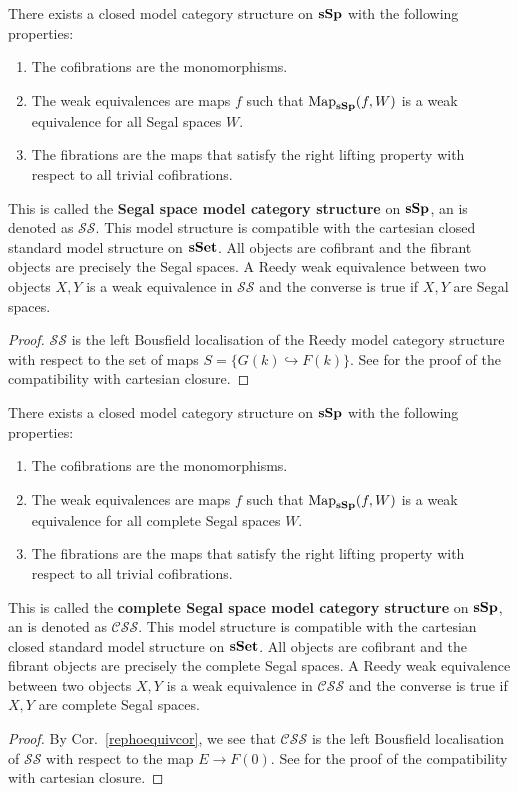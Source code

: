 \begin{refsection}
\begin{thm}
There exists a closed model category structure on $\mathbf{sSp}$ with the following properties:
\begin{enumerate}
\item The cofibrations are the monomorphisms.
\item The weak equivalences are maps $f$ such that $\operatorname{\mathrm{Map}}_{\mathbf{sSp}}(f,W)$ is a weak equivalence for all Segal spaces $W$.
\item The fibrations are the maps that satisfy the right lifting property with respect to all trivial cofibrations.
\end{enumerate}
This is called the \textbf{Segal space model category structure} on $\mathbf{sSp}$, an is denoted as $\mathcal{SS}$. This model structure is compatible with the cartesian closed standard model structure on $\mathbf{sSet}$. All objects are cofibrant and the fibrant objects are precisely the Segal spaces. A Reedy weak equivalence between two objects $X,Y$ is a weak equivalence in $\mathcal{SS}$ and the converse is true if $X,Y$ are Segal spaces.
\end{thm}
\begin{proof}
$\mathcal{SS}$ is the left Bousfield localisation of the Reedy model category structure with respect to the set of maps $S=\{G(k)\hookrightarrow F(k)\}$. See \cite[Thm 7.1]{rezk} for the proof of the compatibility with cartesian closure.
\end{proof}

\begin{thm}
There exists a closed model category structure on $\mathbf{sSp}$ with the following properties:
\begin{enumerate}
\item The cofibrations are the monomorphisms.
\item The weak equivalences are maps $f$ such that $\operatorname{\mathrm{Map}}_{\mathbf{sSp}}(f,W)$ is a weak equivalence for all complete Segal spaces $W$.
\item The fibrations are the maps that satisfy the right lifting property with respect to all trivial cofibrations.
\end{enumerate}
This is called the \textbf{complete Segal space model category structure} on $\mathbf{sSp}$, an is denoted as $\mathcal{CSS}$. This model structure is compatible with the cartesian closed standard model structure on $\mathbf{sSet}$. All objects are cofibrant and the fibrant objects are precisely the complete Segal spaces. A Reedy weak equivalence between two objects $X,Y$ is a weak equivalence in $\mathcal{CSS}$ and the converse is true if $X,Y$ are complete Segal spaces.
\end{thm}
\begin{proof}
By Cor.~\ref{rephoequivcor}, we see that $\mathcal{CSS}$ is the left Bousfield localisation of $\mathcal{SS}$ with respect to the map $E\to F(0)$. See \cite[Thm 7.2]{rezk}for the proof of the compatibility with cartesian closure.
\end{proof}


\end{refsection}
